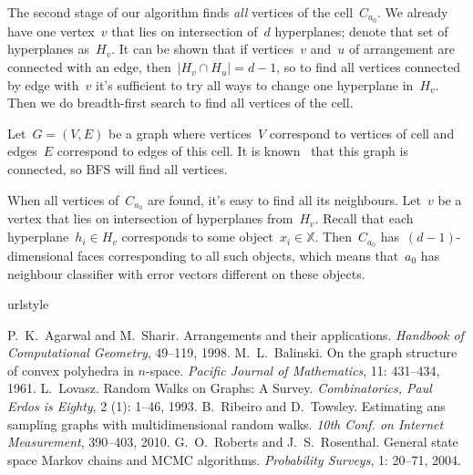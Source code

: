 \documentclass{article}
\let\cite\citep
\def\XX{\mathbb{X}}
\renewcommand{\emph}[1]{\textit{#1}}
\begin{document}
The second stage of our algorithm finds \emph{all} vertices of the cell~$C_{a_0}$.
We already have one vertex~$v$ that lies on intersection of~$d$ hyperplanes;
denote that set of hyperplanes as~$H_v$.
It can be shown that if vertices~$v$ and~$u$ of arrangement are connected with an edge,
then~$|H_v \cap H_u| = d - 1$,
so to find all vertices connected by edge with~$v$ it's sufficient to try all ways
to change one hyperplane in~$H_v$.
Then we do breadth-first search to find all vertices of the cell.

Let~$G = (V, E)$ be a graph where vertices~$V$ correspond to vertices of cell
and edges~$E$ correspond to edges of this cell.
It is known~\cite{balinski61graph} that this graph is connected,
so BFS will find all vertices.

When all vertices of~$C_{a_0}$ are found, it's easy to find all its neighbours.
Let~$v$ be a vertex that lies on intersection of hyperplanes from~$H_v$.
Recall that each hyperplane~$h_i \in H_v$ corresponds to some object~$x_i \in \XX$.
Then~$C_{a_0}$ has~$(d - 1)$-dimensional faces corresponding to all such objects,
which means that~$a_0$ has neighbour classifier with error vectors different on these objects.


\begin{thebibliography}{27}
\providecommand{\natexlab}[1]{#1}
\providecommand{\url}[1]{\texttt{#1}}
\expandafter\ifx\csname urlstyle\endcsname\relax
  \providecommand{\doi}[1]{doi: #1}\else
  \providecommand{\doi}{doi: \begingroup \urlstyle{rm}\Url}\fi

    P.~K.~Agarwal and M.~Sharir.
    \newblock Arrangements and their applications.
    \newblock \emph{Handbook of Computational Geometry}, 49--119, 1998.
    M.~L.~Balinski.
    \newblock On the graph structure of convex polyhedra in $n$-space.
    \newblock \emph{Pacific Journal of Mathematics}, 11: 431--434, 1961.
    L.~Lovasz.
    \newblock Random Walks on Graphs: A Survey.
    \newblock \emph{Combinatorics, Paul Erdos is Eighty}, 2 (1): 1--46, 1993.
    B.~Ribeiro and D.~Towsley.
    \newblock Estimating ans sampling graphs with multidimensional random walks.
    \newblock \emph{10th Conf. on Internet Measurement}, 390--403, 2010.
    G.~O.~Roberts and J.~S.~Rosenthal.
    \newblock General state space Markov chains and MCMC algorithms.
    \newblock \emph{Probability Surveys}, 1: 20--71, 2004.
\end{thebibliography}
\end{document}
